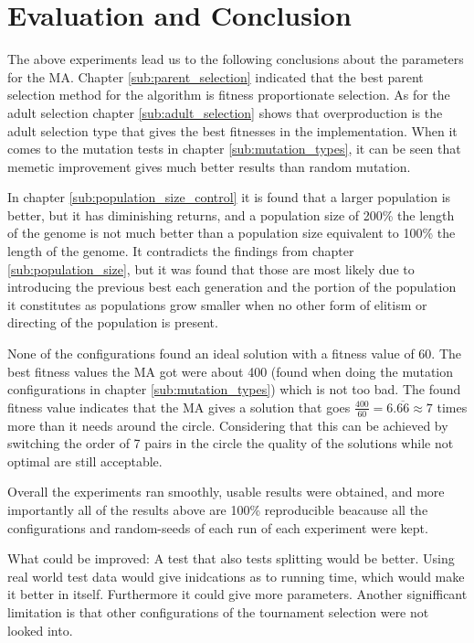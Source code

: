 

\section{Evaluation and Conclusion} %
\label{sec:evaluation_and_conclusion}

The above experiments lead us to the following conclusions about the parameters for the MA. Chapter \ref{sub:parent_selection} indicated that the best parent selection method for the algorithm is fitness proportionate selection. As for the adult selection chapter \ref{sub:adult_selection} shows that overproduction is the adult selection type that gives the best fitnesses in the implementation. When it comes to the mutation tests in chapter \ref{sub:mutation_types}, it can be seen that memetic improvement gives much better results than random mutation.

In chapter \ref{sub:population_size_control} it is found that a larger population is better, but it has diminishing returns, and a population size of 200\% the length of the genome is not much better than a population size equivalent to 100\% the length of the genome. It contradicts the findings from chapter \ref{sub:population_size}, but it was found that those are most likely due to introducing the previous best each generation and the portion of the population it constitutes as populations grow smaller when no other form of elitism or directing of the population is present.

None of the configurations found an ideal solution with a fitness value of 60. The best fitness values the MA got were about 400 (found when doing the mutation configurations in chapter \ref{sub:mutation_types}) which is not too bad. The found fitness value indicates that the MA gives a solution that goes $\frac{400}{60} = 6.\overline{66} \approx 7$ times more than it needs around the circle. Considering that this can be achieved by switching the order of 7 pairs in the circle the quality of the solutions while not optimal are still acceptable.

Overall the experiments ran smoothly, usable results were obtained, and more importantly all of the results above are 100\% reproducible beacause all the configurations and random-seeds of each run of each experiment were kept.

What could be improved: A test that also tests splitting would be better. Using real world test data would give inidcations as to running time, which would make it better in itself. Furthermore it could give more parameters. Another signifficant limitation is that other configurations of the tournament selection were not looked into.


